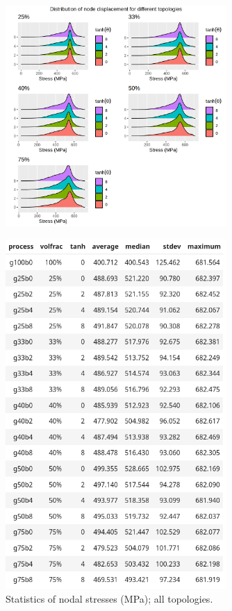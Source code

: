 \documentclass[../main.tex]{subfiles}
\begin{document}
\begin{figure}[h!]
  \centering
  \includegraphics[width=0.75\textwidth]{images/results/plots/femoral/stress/stress_density_ridges.png}
\end{figure}

\begin{figure}[h!]
  \centering
  \includegraphics[width=0.75\textwidth]{images/results/plots/femoral/stress/stress_stats.png}
  \caption{Statistics of nodal stresses (MPa); all topologies.}
  \label{fig:stress_stats}
\end{figure}
\end{document}
